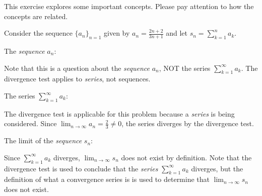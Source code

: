 \documentclass{ximera}
\author{Jim Talamo}
\begin{document}
\begin{exercise}
This exercise explores some important concepts.  Please pay attention to how the concepts are related.

Consider the sequence $\{a_n\}_{n=1}$ given by $a_n = \frac{2n+2}{3n+1}$ and let $s_n = \sum_{k=1}^n a_k$.

The \emph{sequence} $a_n$:

\begin{multipleChoice}
\end{multipleChoice}

\begin{feedback}
Note that this is a question about the \emph{sequence} $a_n$, NOT the series $\sum_{k=1}^{\infty} a_k$.  The divergence test applies to \emph{series}, not sequences.
\end{feedback}

The series $\sum_{k=1}^{\infty} a_k$:

\begin{multipleChoice}
\end{multipleChoice}

\begin{feedback}
The divergence test is applicable for this problem because a \emph{series} is being considered.  Since $\lim_{n \to \infty} a_n =  \frac{2}{3} \neq 0$, the series diverges by the divergence test.
\end{feedback}



The limit of the \emph{sequence} $s_n$:

\begin{multipleChoice}
\end{multipleChoice}
\begin{feedback}
Since $\sum_{k=1}^{\infty} a_k$ diverges, $\lim_{n \to \infty} s_n$ does not exist by definition.  Note that the divergence test is used to conclude that the \emph{series} $\sum_{k=1}^{\infty} a_k$ diverges, but the definition of what a convergence series is is used to determine that $\lim_{n \to \infty} s_n$ does not exist.
\end{feedback}
\end{exercise}
\end{document}
